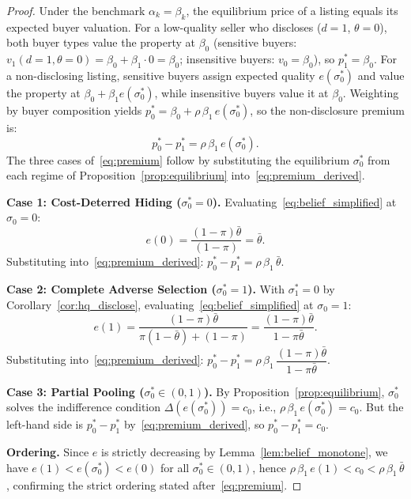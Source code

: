 \documentclass[10pt,letterpaper]{bp-template-concise}
\begin{document}
\begin{proof}
Under the benchmark $\alpha_k=\beta_k$, the equilibrium price of a listing equals its expected buyer valuation. For a low-quality seller who discloses ($d=1$, $\theta=0$), both buyer types value the property at $\beta_0$ (sensitive buyers: $v_1(d=1,\theta=0)=\beta_0+\beta_1\cdot 0=\beta_0$; insensitive buyers: $v_0=\beta_0$), so $p_1^*=\beta_0$. For a non-disclosing listing, sensitive buyers assign expected quality $e(\sigma_0^*)$ and value the property at $\beta_0+\beta_1 e(\sigma_0^*)$, while insensitive buyers value it at $\beta_0$. Weighting by buyer composition yields $p_0^*=\beta_0+\rho\,\beta_1\,e(\sigma_0^*)$, so the non-disclosure premium is:
\begin{equation}
    p_0^*-p_1^* = \rho\,\beta_1\,e(\sigma_0^*). \label{eq:premium_derived}
\end{equation}
The three cases of~\eqref{eq:premium} follow by substituting the equilibrium $\sigma_0^*$ from each regime of Proposition~\ref{prop:equilibrium} into~\eqref{eq:premium_derived}.

\medskip
\textbf{Case 1: Cost-Deterred Hiding ($\sigma_0^*=0$).}
Evaluating~\eqref{eq:belief_simplified} at $\sigma_0=0$:
\[
    e(0) = \frac{(1-\pi)\bar{\theta}}{(1-\pi)} = \bar{\theta}.
\]
Substituting into~\eqref{eq:premium_derived}: $p_0^*-p_1^* = \rho\,\beta_1\,\bar{\theta}$.

\medskip
\textbf{Case 2: Complete Adverse Selection ($\sigma_0^*=1$).}
With $\sigma_1^*=0$ by Corollary~\ref{cor:hq_disclose}, evaluating~\eqref{eq:belief_simplified} at $\sigma_0=1$:
\[
    e(1) = \frac{(1-\pi)\bar{\theta}}{\pi(1-\bar{\theta})+(1-\pi)} = \frac{(1-\pi)\bar{\theta}}{1-\pi\bar{\theta}}.
\]
Substituting into~\eqref{eq:premium_derived}: $p_0^*-p_1^* = \rho\,\beta_1\,\dfrac{(1-\pi)\bar{\theta}}{1-\pi\bar{\theta}}$.

\medskip
\textbf{Case 3: Partial Pooling ($\sigma_0^*\in(0,1)$).}
By Proposition~\ref{prop:equilibrium}, $\sigma_0^*$ solves the indifference condition $\Delta(e(\sigma_0^*))=c_0$, i.e., $\rho\,\beta_1\,e(\sigma_0^*)=c_0$. But the left-hand side is $p_0^*-p_1^*$ by~\eqref{eq:premium_derived}, so $p_0^*-p_1^*=c_0$.

\medskip
\textbf{Ordering.}
Since $e$ is strictly decreasing by Lemma~\ref{lem:belief_monotone}, we have $e(1)<e(\sigma_0^*)<e(0)$ for all $\sigma_0^*\in(0,1)$, hence $\rho\,\beta_1\,e(1)<c_0<\rho\,\beta_1\,\bar{\theta}$, confirming the strict ordering stated after~\eqref{eq:premium}.
\end{proof}
\end{document}
